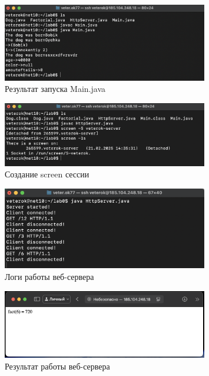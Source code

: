 \documentclass[a4paper, 14pt]{extarticle}
\begin{document}
\newpage

\begin{figure}[!htb]
	\centering
	\includegraphics[width=0.8\textwidth]{images/photo2.png}
\caption{Результат запуска Main.java}
\label{fig:photo2}
\end{figure}

\begin{figure}[!htb]
	\centering
	\includegraphics[width=0.8\textwidth]{images/photo3.png}
\caption{Создание screen сессии}
\label{fig:photo2}
\end{figure}

\begin{figure}[!htb]
	\centering
	\includegraphics[width=0.8\textwidth]{images/photo4.png}
\caption{Логи работы веб-сервера}
\label{fig:photo2}
\end{figure}

\begin{figure}[!htb]
	\centering
	\includegraphics[width=0.8\textwidth]{images/photo5.png}
\caption{Результат работы веб-сервера}
\label{fig:photo2}
\end{figure}
\end{document}
